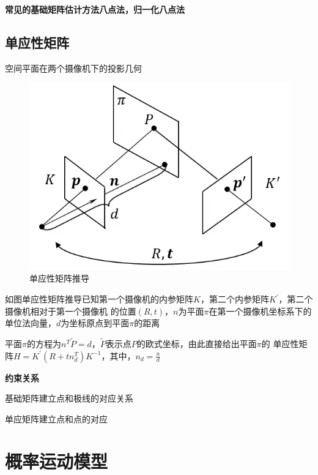 \documentclass[10pt]{article}
\begin{document}
\noindent\textbf{常见的基础矩阵估计方法八点法，归一化八点法}
\subsection{单应性矩阵}
空间平面在两个摄像机下的投影几何
\begin{figure}[!htb]
    \includegraphics[width=\hsize]{images/单应性矩阵推导.png}
    \caption{单应性矩阵推导} 
\end{figure}
如图单应性矩阵推导已知第一个摄像机的内参矩阵$K$，第二个内参矩阵$K^{'}$，第二个摄像机相对于第一个摄像机
的位置$(R,t)$，$n$为平面$\pi$在第一个摄像机坐标系下的单位法向量，$d$为坐标原点到平面$\pi$的距离

平面$\pi$的方程为$n^{T}\tilde{P}=d$，$\tilde{P}$表示点$P$的欧式坐标，由此直接给出平面$\pi$的
单应性矩阵$H=K^{'}(R+tn_{d}^{T})K^{-1}$，其中，$n_{d}=\frac{n}{d}$

\textbf{约束关系}

基础矩阵建立点和极线的对应关系

单应矩阵建立点和点的对应







\newpage
\section{概率运动模型}
\end{document}
